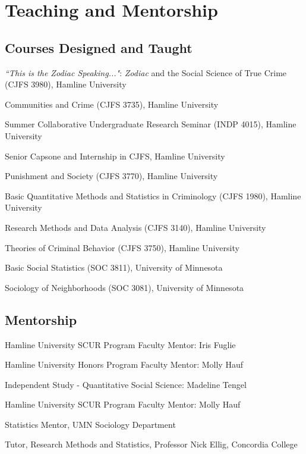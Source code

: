 \documentclass[letterpaper]{article}
\newenvironment{publist}{%
  \begin{list}{}{%
    \setlength{\leftmargin}{0cm}   %
    \setlength{\labelwidth}{2cm}     %
    \setlength{\labelsep}{0.5cm}     %
  }%
}{%
  \end{list}%
}
\begin{document}
\section*{\textbf{Teaching and Mentorship}}

\subsection*{Courses Designed and Taught}


\begin{publist} 

\item \textit{``This is the Zodiac Speaking..."}: \textit{Zodiac} and the Social Science of True Crime (CJFS 3980), Hamline University
\item Communities and Crime (CJFS 3735), Hamline University
\item Summer Collaborative Undergraduate Research Seminar (INDP 4015), Hamline University
\item Senior Capsone and Internship in CJFS, Hamline University
\item Punishment and Society (CJFS 3770), Hamline University
\item Basic Quantitative Methods and Statistics in Criminology (CJFS 1980), Hamline University
\item Research Methods and Data Analysis (CJFS 3140), Hamline University
\item Theories of Criminal Behavior (CJFS 3750), Hamline University
\item Basic Social Statistics (SOC 3811), University of Minnesota
\item Sociology of Neighborhoods (SOC 3081), University of Minnesota

\end{publist}


\subsection*{Mentorship}

\begin{publist}

\item[\textbf{2025}] Hamline University SCUR Program Faculty Mentor: Iris Fuglie
\item[\textbf{2023-2024}] Hamline University Honors Program Faculty Mentor: Molly Hauf
\item[\textbf{2023}] Independent Study - Quantitative Social Science: Madeline Tengel 
\item Hamline University SCUR Program Faculty Mentor: Molly Hauf
\item[\textbf{2020-2021}] Statistics Mentor, UMN Sociology Department
\item[\textbf{2013-2014}] Tutor, Research Methods and Statistics, Professor Nick Ellig, Concordia College

\end{publist}
\end{document}
